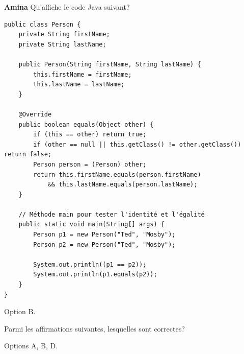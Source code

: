 \begin{Exercice}[5 minutes]\textbf{Amina}
Qu'affiche le code Java suivant?

\begin{lstlisting}[style=javastyle]
public class Person {
    private String firstName;
    private String lastName;

    public Person(String firstName, String lastName) {
        this.firstName = firstName;
        this.lastName = lastName;
    }

    @Override
    public boolean equals(Object other) {
        if (this == other) return true;
        if (other == null || this.getClass() != other.getClass()) return false;
        Person person = (Person) other;
        return this.firstName.equals(person.firstName)
            && this.lastName.equals(person.lastName);
    }

    // Méthode main pour tester l'identité et l'égalité
    public static void main(String[] args) {
        Person p1 = new Person("Ted", "Mosby");
        Person p2 = new Person("Ted", "Mosby");

        System.out.println((p1 == p2));
        System.out.println(p1.equals(p2));
    }
}
\end{lstlisting}


\begin{solution}
Option B.
\end{solution}

Parmi les affirmations suivantes, lesquelles sont correctes? 

\begin{solution}
Options A, B, D. 
\end{solution}
\end{Exercice}

